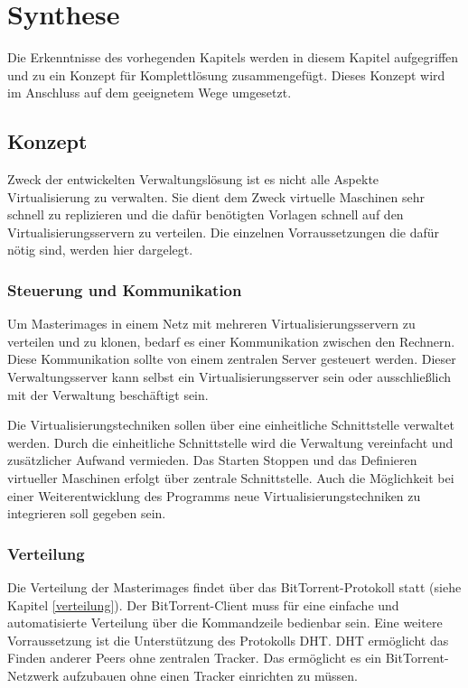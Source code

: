\chapter{Synthese}
Die Erkenntnisse des vorhegenden Kapitels werden in diesem Kapitel aufgegriffen und zu ein Konzept für Komplettlösung zusammengefügt. Dieses Konzept wird im Anschluss auf dem geeignetem Wege umgesetzt.
\section{Konzept}
Zweck der entwickelten Verwaltungslösung ist es nicht alle Aspekte Virtualisierung zu verwalten. Sie dient dem Zweck virtuelle Maschinen sehr schnell zu replizieren und die dafür benötigten Vorlagen schnell auf den Virtualisierungsservern zu verteilen. Die einzelnen Vorraussetzungen die dafür nötig sind, werden hier dargelegt.

\subsection{Steuerung und Kommunikation}
Um Masterimages in einem Netz mit mehreren Virtualisierungsservern zu verteilen und zu klonen, bedarf es einer Kommunikation zwischen den Rechnern. Diese Kommunikation sollte von einem zentralen Server gesteuert werden. Dieser Verwaltungsserver kann selbst ein Virtualisierungsserver sein oder ausschließlich mit der Verwaltung beschäftigt sein.

Die Virtualisierungstechniken sollen über eine einheitliche Schnittstelle verwaltet werden. Durch die einheitliche Schnittstelle wird die Verwaltung vereinfacht und zusätzlicher Aufwand vermieden. Das Starten Stoppen und das Definieren virtueller Maschinen erfolgt über zentrale Schnittstelle. Auch die Möglichkeit bei einer Weiterentwicklung des Programms neue Virtualisierungstechniken zu integrieren soll gegeben sein.

\subsection{Verteilung}
Die Verteilung der Masterimages findet über das BitTorrent-Protokoll statt (siehe Kapitel \ref{verteilung}). Der BitTorrent-Client muss für eine einfache und automatisierte Verteilung über die Kommandzeile bedienbar sein. Eine weitere Vorraussetzung ist die Unterstützung des Protokolls DHT. DHT ermöglicht das Finden anderer Peers ohne zentralen Tracker. Das ermöglicht es ein BitTorrent-Netzwerk aufzubauen ohne einen Tracker einrichten zu müssen.

